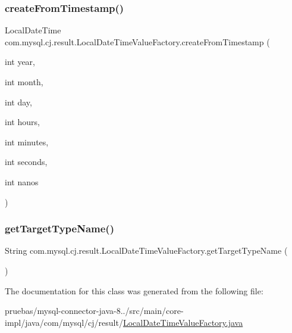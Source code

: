 \subsubsection{\texorpdfstring{create\+From\+Timestamp()}{createFromTimestamp()}}
{\footnotesize\ttfamily Local\+Date\+Time com.\+mysql.\+cj.\+result.\+Local\+Date\+Time\+Value\+Factory.\+create\+From\+Timestamp (\begin{DoxyParamCaption}\item[{int}]{year,  }\item[{int}]{month,  }\item[{int}]{day,  }\item[{int}]{hours,  }\item[{int}]{minutes,  }\item[{int}]{seconds,  }\item[{int}]{nanos }\end{DoxyParamCaption})}

\mbox{\label{classcom_1_1mysql_1_1cj_1_1result_1_1_local_date_time_value_factory_a900e37dad9b8f0167f8dc251ebe72846}} 
\subsubsection{\texorpdfstring{get\+Target\+Type\+Name()}{getTargetTypeName()}}
{\footnotesize\ttfamily String com.\+mysql.\+cj.\+result.\+Local\+Date\+Time\+Value\+Factory.\+get\+Target\+Type\+Name (\begin{DoxyParamCaption}{ }\end{DoxyParamCaption})}



The documentation for this class was generated from the following file\+:\begin{DoxyCompactItemize}
\item 
pruebas/mysql-\/connector-\/java-\/8../src/main/core-\/impl/java/com/mysql/cj/result/\mbox{\hyperlink{_local_date_time_value_factory_8java}{Local\+Date\+Time\+Value\+Factory.\+java}}\end{DoxyCompactItemize}
